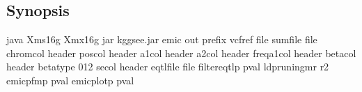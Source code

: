 \documentclass[letterpaper,10pt,english,openany,oneside]{sphinxmanual}
\begin{document}
\subsection{Synopsis}
\label{\detokenize{detailed_document:id6}}
\begin{sphinxVerbatim}[commandchars=\\\{\}]
java \PYGZhy{}Xms16g \PYGZhy{}Xmx16g \PYGZhy{}jar kggsee.jar
  \PYGZhy{}\PYGZhy{}emic
  \PYGZhy{}\PYGZhy{}out \PYGZlt{}prefix\PYGZgt{}
  \PYGZhy{}\PYGZhy{}vcf\PYGZhy{}ref \PYGZlt{}file\PYGZgt{}
  \PYGZhy{}\PYGZhy{}sum\PYGZhy{}file \PYGZlt{}file\PYGZgt{}
  \PYGZhy{}\PYGZhy{}chrom\PYGZhy{}col \PYGZlt{}header\PYGZgt{}  
  \PYGZhy{}\PYGZhy{}pos\PYGZhy{}col \PYGZlt{}header\PYGZgt{}  
  \PYGZhy{}\PYGZhy{}a1\PYGZhy{}col \PYGZlt{}header\PYGZgt{}  
  \PYGZhy{}\PYGZhy{}a2\PYGZhy{}col \PYGZlt{}header\PYGZgt{}  
  \PYGZhy{}\PYGZhy{}freq\PYGZhy{}a1\PYGZhy{}col \PYGZlt{}header\PYGZgt{}  
  \PYGZhy{}\PYGZhy{}beta\PYGZhy{}col \PYGZlt{}header\PYGZgt{}
  \PYGZhy{}\PYGZhy{}beta\PYGZhy{}type \PYGZlt{}012\PYGZgt{}
  \PYGZhy{}\PYGZhy{}se\PYGZhy{}col \PYGZlt{}header\PYGZgt{}  
  \PYGZhy{}\PYGZhy{}eqtl\PYGZhy{}file \PYGZlt{}file\PYGZgt{}
  \PYGZhy{}\PYGZhy{}filter\PYGZhy{}eqtl\PYGZhy{}p \PYGZlt{}pval\PYGZgt{}  
  \PYGZhy{}\PYGZhy{}ld\PYGZhy{}pruning\PYGZhy{}mr  \PYGZlt{}r2\PYGZgt{}  
  \PYGZhy{}\PYGZhy{}emic\PYGZhy{}pfm\PYGZhy{}p \PYGZlt{}pval\PYGZgt{}  
  \PYGZhy{}\PYGZhy{}emic\PYGZhy{}plot\PYGZhy{}p \PYGZlt{}pval\PYGZgt{}  
\end{sphinxVerbatim}
\end{document}
